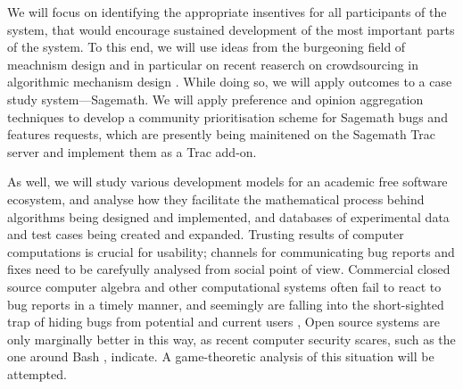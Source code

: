 \begin{workpackage}[id=social-aspects,wphases=1-48!.5,
  title=Social Aspects,
  lead=UO,
  UORM=1,USHRM=8]
\begin{wpdescription}
We will focus on identifying the appropriate insentives for all
participants of the system, that would encourage sustained development of the
most important parts of the system.  To this end, we will use ideas from the
burgeoning field of meachnism design \cite{AGTbook} and in
particular on recent reaserch on crowdsourcing in algorithmic mechanism design
\cite{crowds}.  While doing so, we will apply outcomes to a case study
system---Sagemath.
We will apply preference and opinion aggregation techniques \cite{pref-aggr} to  develop
a community prioritisation scheme for Sagemath bugs and features requests, which 
are presently being mainitened on the Sagemath Trac server \cite{trac-sagemath}  and implement
them as a Trac \cite{Trac} add-on.

As well, we will study various development models for an academic free software ecosystem,
and analyse how they facilitate the mathematical process behind algorithms being
designed and implemented,  and databases of experimental data and test cases being
created and expanded.
Trusting results of computer
computations is crucial for usability; channels for communicating bug reports
and fixes need to be carefyully analysed from social point of view. 
Commercial closed source computer algebra and other computational systems often
fail to react to bug reports in a timely manner, and seemingly are falling into the
short-sighted trap of hiding bugs from potential and current users \cite{misfort},
Open source  systems are only marginally better in this way, as recent
computer security scares, such as the one around Bash \cite{shellshock}, indicate.
A game-theoretic analysis of this situation will be attempted.
\end{wpdescription}


\end{workpackage}
